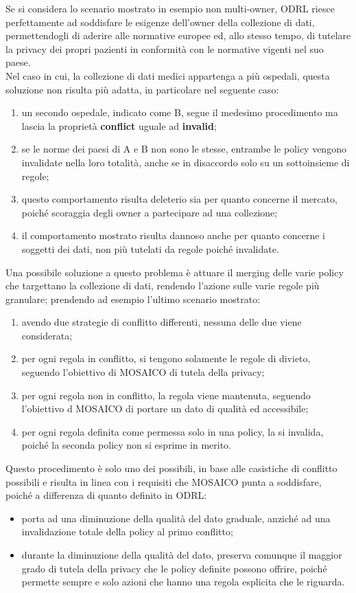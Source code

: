 \documentclass[12pt,a4paper,twoside]{book}
\begin{document}
Se si considera lo scenario mostrato in esempio non multi-owner, ODRL riesce perfettamente ad soddisfare le esigenze dell'owner della collezione di dati, permettendogli di aderire alle normative europee ed, allo stesso tempo, di tutelare la privacy dei propri pazienti in conformità con le normative vigenti nel suo paese.\\
Nel caso in cui, la collezione di dati medici appartenga a più ospedali, questa soluzione non risulta più adatta, in particolare nel seguente caso:
\begin{enumerate}
	\item un secondo ospedale, indicato come B, segue il medesimo procedimento ma lascia la proprietà \textbf{conflict} uguale ad \textbf{invalid};
	\item se le norme dei paesi di A e B non sono le stesse, entrambe le policy vengono invalidate nella loro totalità, anche se in disaccordo solo su un sottoinsieme di regole;
	\item questo comportamento risulta deleterio sia per quanto concerne il mercato, poiché scoraggia degli owner a partecipare ad una collezione; \item il comportamento mostrato risulta dannoso anche per quanto concerne i soggetti dei dati, non più tutelati da regole poiché invalidate.
\end{enumerate}
Una possibile soluzione a questo problema è attuare il merging delle varie policy che targettano la collezione di dati, rendendo l'azione sulle varie regole più granulare; prendendo ad esempio l'ultimo scenario mostrato:
\begin{enumerate}
	\item avendo due strategie di conflitto differenti, nessuna delle due viene considerata;
	\item per ogni regola in conflitto, si tengono solamente le regole di divieto, seguendo l'obiettivo di MOSAICO di tutela della privacy;
	\item per ogni regola non in conflitto, la regola viene mantenuta, seguendo l'obiettivo d MOSAICO di portare un dato di qualità ed accessibile;
	\item per ogni regola definita come permessa solo in una policy, la si invalida, poiché la seconda policy non si esprime in merito.
\end{enumerate}
Questo procedimento è solo uno dei possibili, in base alle casistiche di conflitto possibili e risulta in linea con i requisiti che MOSAICO punta a soddisfare, poiché a differenza di quanto definito in ODRL:
\begin{itemize}
	\item porta ad una diminuzione della qualità del dato graduale, anziché ad una invalidazione totale della policy al primo conflitto;
	\item durante la diminuzione della qualità del dato, preserva comunque il maggior grado di tutela della privacy che le policy definite possono offrire, poiché permette sempre e solo azioni che hanno una regola esplicita che le riguarda.
\end{itemize}
\end{document}
